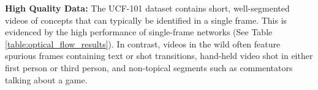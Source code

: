 \documentclass[10pt,twocolumn,letterpaper]{article}
\begin{document}
\textbf{High Quality Data:} The UCF-101 dataset contains short,
well-segmented videos of concepts that can typically be identified in a single
frame. This is evidenced by the high performance of single-frame networks
(See Table \ref{table:optical_flow_results}). In contrast, videos in the wild often
feature spurious frames containing text or shot transitions, hand-held video
shot in either first person or third person, and non-topical segments such as
commentators talking about a game.

\begin{table}[t]
\begin{center}
\end{center}
\vspace{-1em}
\caption{Lower frame rates produce higher UCF-101 accuracy for 30-frame Conv-Pooling models.}
\label{table:frame_rate}
\vspace{-2em}
\end{table}
\end{document}
